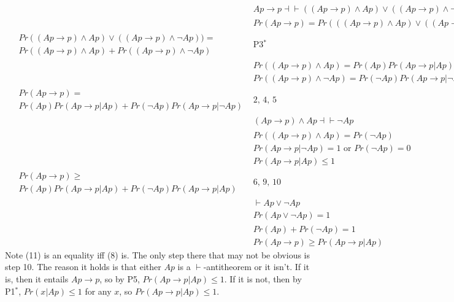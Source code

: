 \renewcommand{\labelenumi}{(\arabic{enumi})}
\begin{align}
&Ap \rightarrow p \dashv \vdash ((Ap \rightarrow p) \wedge Ap) \vee ((Ap \rightarrow p) \wedge \neg Ap) & \text{} \\
&Pr(Ap \rightarrow p) = Pr(((Ap \rightarrow p) \wedge Ap) \vee ((Ap \rightarrow p) \wedge \neg Ap)) & \text{1, P2$^*$} \\
\begin{split}& Pr ((Ap \rightarrow p) \wedge Ap) \vee ((Ap \rightarrow p) \wedge \neg Ap)) = \\&Pr ((Ap \rightarrow p) \wedge Ap) + Pr ((Ap \rightarrow p) \wedge \neg Ap)  %
\end{split} & \text{P3$^*$}  \\
&Pr((Ap \rightarrow p) \wedge Ap) = Pr (Ap)Pr(Ap \rightarrow p|Ap) & \text{P6} \\
&Pr((Ap \rightarrow p) \wedge \neg Ap) = Pr(\neg Ap)Pr(Ap \rightarrow p |\neg Ap) & \text{P6} \\
\begin{split}&Pr(Ap \rightarrow p) = \\&Pr(Ap)Pr(Ap \rightarrow p|Ap) + Pr (\neg Ap)Pr(Ap \rightarrow p |\neg Ap) \end{split}& \text{2, 4, 5} \\
&(Ap \rightarrow p) \wedge Ap \dashv \vdash \neg Ap & \text{} \\
&Pr((Ap \rightarrow p) \wedge Ap) = Pr(\neg Ap) & \text{7, P2$^*$} \\
&Pr(Ap \rightarrow p |\neg Ap) = 1 \text{ or } Pr(\neg Ap) = 0 & \text{8, P6}  \\
&Pr(Ap \rightarrow p | Ap) \leq 1 & \text{P4, P5} \\
\begin{split} &Pr(Ap \rightarrow p) \geq \\ &Pr(Ap)Pr(Ap \rightarrow p|Ap) + Pr (\neg Ap)Pr(Ap \rightarrow p |Ap) \end{split} & \text{6, 9, 10} \\
&\vdash Ap \vee \neg Ap & \text{} \\
&Pr(Ap \vee \neg Ap) = 1 & \text{12, P1} \\
&Pr(Ap) + Pr (\neg Ap) = 1 & \text{13, P3$^*$} \\
&Pr(Ap \rightarrow p ) \geq Pr (Ap \rightarrow p|Ap) & \text{11, 14} 
\end{align}
\noindent Note (11) is an equality iff (8) is. The only step there that may not be obvious is step 10. The reason it holds is that either $Ap$ is a $\vdash$-antitheorem or it isn't. If it is, then it entails $Ap \rightarrow p$, so by P5, $Pr(Ap \rightarrow p | Ap) \leq 1$. If it is not, then by P1$^*$, $Pr(x | Ap) \leq 1$ for any $x$, so $Pr(Ap \rightarrow p | Ap) \leq 1$.


